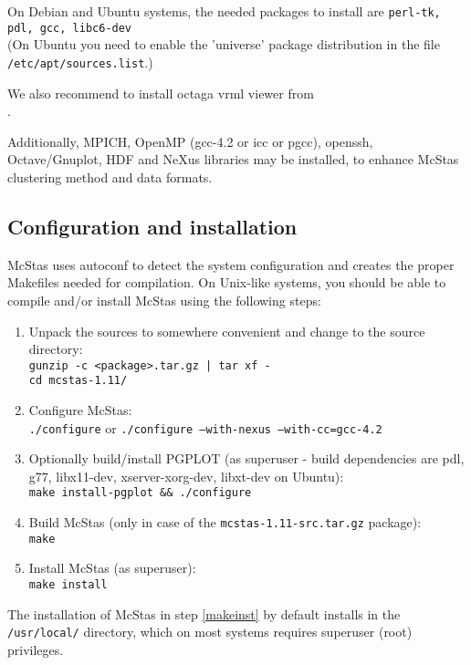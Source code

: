 \noindent On Debian and Ubuntu systems, the
needed packages to install are \texttt{perl-tk, pdl, gcc,
  libc6-dev} \\(On Ubuntu you need to enable the 'universe' package
distribution in the file \\\verb+/etc/apt/sources.list+.)

\noindent We also recommend to install octaga vrml viewer from
\\.

\noindent Additionally, MPICH, OpenMP (gcc-4.2 or icc or pgcc), openssh, Octave/Gnuplot, HDF and NeXus libraries may be installed, to enhance McStas clustering method and data formats.

\subsection{Configuration and installation}
McStas uses autoconf to detect the system configuration and creates the
proper Makefiles needed for compilation. On Unix-like systems, you
should be able to compile and/or install McStas using the following steps:
\begin{enumerate}
\item{Unpack the sources to somewhere convenient and change to the
    source directory:\\
  \texttt{gunzip -c <package>.tar.gz | tar xf -}\\
  \texttt{cd mcstas-1.11/}}
\item{Configure McStas:\\
  \texttt{./configure} or \texttt{./configure --with-nexus --with-cc=gcc-4.2}}
\item{Optionally build/install PGPLOT (as superuser - build
    dependencies are pdl, g77, libx11-dev, xserver-xorg-dev, libxt-dev
    on Ubuntu):\\
    \texttt{make install-pgplot \&\& ./configure}
    \label{pg_install}}
\item{Build McStas (only in case of the \verb+mcstas-1.11-src.tar.gz+ package):\\
  \texttt{make}}
\item{Install McStas (as superuser):\\
  \texttt{make install}
\label{makeinst}}
\end{enumerate}



\noindent The installation of McStas in step \ref{makeinst} by default installs in the
\texttt{/usr/local/} directory, which on most systems requires superuser (root)
privileges.

